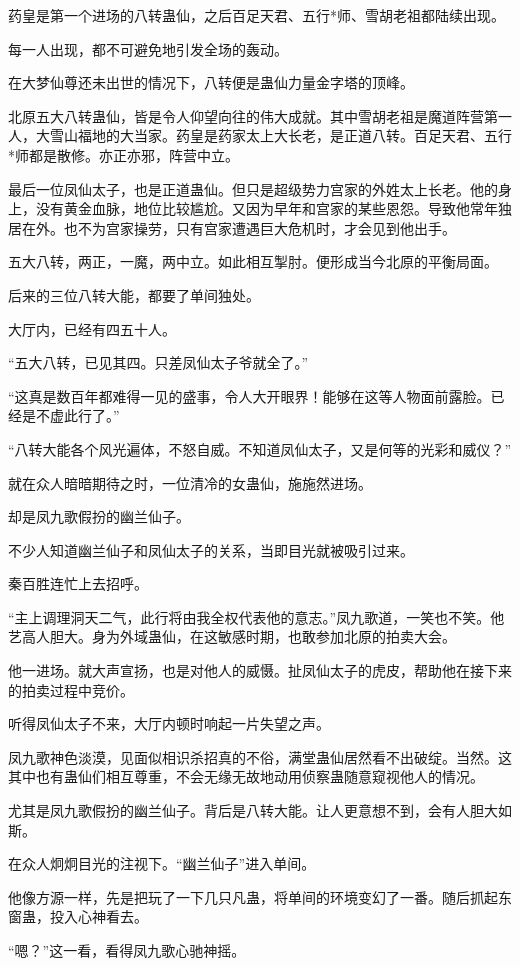 \begin{this_body}
药皇是第一个进场的八转蛊仙，之后百足天君、五行*师、雪胡老祖都陆续出现。

每一人出现，都不可避免地引发全场的轰动。

在大梦仙尊还未出世的情况下，八转便是蛊仙力量金字塔的顶峰。

北原五大八转蛊仙，皆是令人仰望向往的伟大成就。其中雪胡老祖是魔道阵营第一人，大雪山福地的大当家。药皇是药家太上大长老，是正道八转。百足天君、五行*师都是散修。亦正亦邪，阵营中立。

最后一位凤仙太子，也是正道蛊仙。但只是超级势力宫家的外姓太上长老。他的身上，没有黄金血脉，地位比较尴尬。又因为早年和宫家的某些恩怨。导致他常年独居在外。也不为宫家操劳，只有宫家遭遇巨大危机时，才会见到他出手。

五大八转，两正，一魔，两中立。如此相互掣肘。便形成当今北原的平衡局面。

后来的三位八转大能，都要了单间独处。

大厅内，已经有四五十人。

“五大八转，已见其四。只差凤仙太子爷就全了。”

“这真是数百年都难得一见的盛事，令人大开眼界！能够在这等人物面前露脸。已经是不虚此行了。”

“八转大能各个风光遍体，不怒自威。不知道凤仙太子，又是何等的光彩和威仪？”

就在众人暗暗期待之时，一位清冷的女蛊仙，施施然进场。

却是凤九歌假扮的幽兰仙子。

不少人知道幽兰仙子和凤仙太子的关系，当即目光就被吸引过来。

秦百胜连忙上去招呼。

“主上调理洞天二气，此行将由我全权代表他的意志。”凤九歌道，一笑也不笑。他艺高人胆大。身为外域蛊仙，在这敏感时期，也敢参加北原的拍卖大会。

他一进场。就大声宣扬，也是对他人的威慑。扯凤仙太子的虎皮，帮助他在接下来的拍卖过程中竞价。

听得凤仙太子不来，大厅内顿时响起一片失望之声。

凤九歌神色淡漠，见面似相识杀招真的不俗，满堂蛊仙居然看不出破绽。当然。这其中也有蛊仙们相互尊重，不会无缘无故地动用侦察蛊随意窥视他人的情况。

尤其是凤九歌假扮的幽兰仙子。背后是八转大能。让人更意想不到，会有人胆大如斯。

在众人炯炯目光的注视下。“幽兰仙子”进入单间。

他像方源一样，先是把玩了一下几只凡蛊，将单间的环境变幻了一番。随后抓起东窗蛊，投入心神看去。

“嗯？”这一看，看得凤九歌心驰神摇。


\end{this_body}
